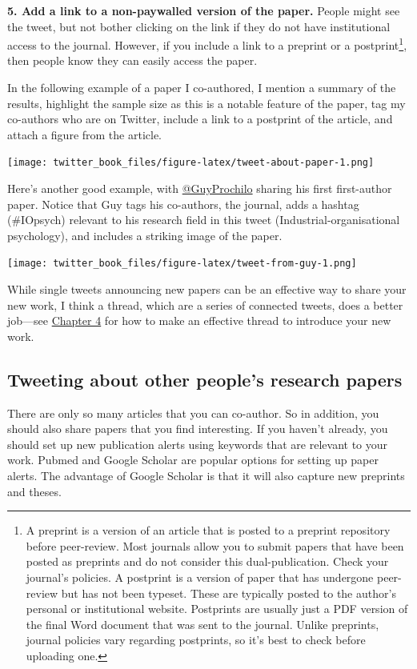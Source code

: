 \documentclass[
]{book}
\begin{document}
\textbf{5. Add a link to a non-paywalled version of the paper.} People might see the tweet, but not bother clicking on the link if they do not have institutional access to the journal. However, if you include a link to a preprint or a postprint\footnote{A preprint is a version of an article that is posted to a preprint repository before peer-review. Most journals allow you to submit papers that have been posted as preprints and do not consider this dual-publication. Check your journal's policies. A postprint is a version of paper that has undergone peer-review but has not been typeset. These are typically posted to the author's personal or institutional website. Postprints are usually just a PDF version of the final Word document that was sent to the journal. Unlike preprints, journal policies vary regarding postprints, so it's best to check before uploading one.}, then people know they can easily access the paper.

In the following example of a paper I co-authored, I mention a summary of the results, highlight the sample size as this is a notable feature of the paper, tag my co-authors who are on Twitter, include a link to a postprint of the article, and attach a figure from the article.

\texttt{[image: twitter\_book\_files/figure-latex/tweet-about-paper-1.png]}

Here's another good example, with \href{https://twitter.com/GuyProchilo}{@GuyProchilo} sharing his first first-author paper. Notice that Guy tags his co-authors, the journal, adds a hashtag (\#IOpsych) relevant to his research field in this tweet (Industrial-organisational psychology), and includes a striking image of the paper.

\texttt{[image: twitter\_book\_files/figure-latex/tweet-from-guy-1.png]}

While single tweets announcing new papers can be an effective way to share your new work, I think a thread, which are a series of connected tweets, does a better job---see \protect\hyperlink{advanced-twitter-skills}{Chapter 4} for how to make an effective thread to introduce your new work.

\hypertarget{tweeting-about-other-peoples-research-papers}{%
\subsection{Tweeting about other people's research papers}\label{tweeting-about-other-peoples-research-papers}}

There are only so many articles that you can co-author. So in addition, you should also share papers that you find interesting. If you haven't already, you should set up new publication alerts using keywords that are relevant to your work. Pubmed and Google Scholar are popular options for setting up paper alerts. The advantage of Google Scholar is that it will also capture new preprints and theses.
\end{document}
